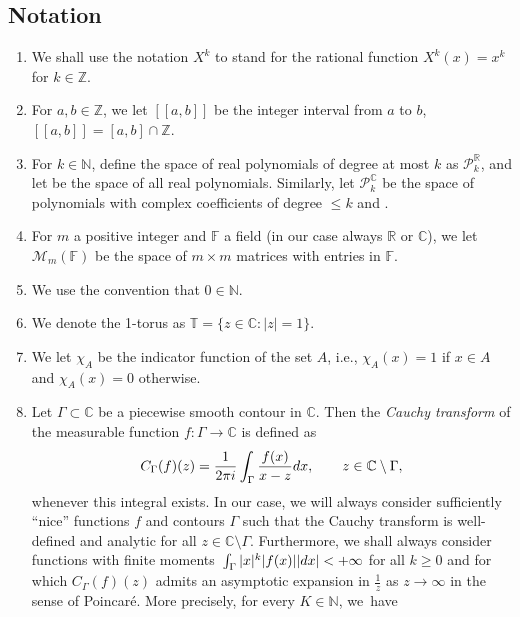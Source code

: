 \documentclass[11pt]{article}
\numberwithin{equation}{section}
\numberwithin{equation}{section}
\begin{document}
\subsection{Notation}
\begin{enumerate}\itemsep=0pt
\item[(1)] We shall use the notation $\mathit{X}^k$ to stand for the rational function $\mathit{X}^k(x) = x^k$ for $k \in \mathbb{Z}$.
\item[(2)] For $a,b \in \mathbb{Z}$, we let $[\![a,b]\!]$ be the integer interval from $a$ to $b$, $[\![a,b]\!] = [a,b] \cap \mathbb{Z}$.
\item[(3)] For $k \in \mathbb{N}$, define the space of real polynomials of degree at most $k$ as
$\mathscr{P}_{k}^\mathbb{R}$, and let
 be the space of all real polynomials. Similarly, let $\mathscr{P}^\mathbb{C}_k$ be the space of polynomials with complex coefficients of degree $\leq k$ and .
\item[(4)] For $m$ a positive integer and $\mathbb{F}$ a field (in our case always $\mathbb{R}$ or $\mathbb{C}$), we let $\mathcal{M}_m (\mathbb{F})$ be the space of $m \times m$ matrices with entries in $\mathbb{F}$.
\item[(5)] We use the convention that $0 \in \mathbb{N}$.
\item[(6)] We denote the 1-torus as $\mathbb{T} = \{ z \in \mathbb{C} \colon |z|=1 \}$.
\item[(7)] We let $\chi_A$ be the indicator function of the set $A$, i.e., $\chi_A(x) = 1$ if $x \in A$ and $\chi_A(x) = 0$ otherwise.
\item[(8)] Let $\Gamma \subset \mathbb{C}$ be a piecewise smooth contour in $\mathbb{C}$. Then the \textit{Cauchy transform} of the measurable function $f\colon \Gamma \longrightarrow \mathbb{C}$ is defined as
\[
C_\Gamma (f) (z) = \frac{1}{2\pi {\rm i}}\int_\Gamma \frac{f(x)}{x-z} {\rm d}x,\qquad z \in \mathbb{C}\setminus \Gamma,
\]
whenever this integral exists. In our case, we will always consider sufficiently \enquote{nice} functions $f$ and contours $\Gamma$ such that the Cauchy transform is well-defined and analytic for all $z \in \mathbb{C}\setminus \Gamma$. Furthermore, we shall always consider functions with finite moments~${\int_\Gamma |x|^k |f(x)| |{\rm d}x| < +\infty}$ for all $k\geq 0$ and for which $C_\Gamma (f)(z)$ admits an asymptotic expansion in $\frac{1}{z}$ as $z \to \infty$ in the sense of Poincar\'e. More precisely, for every $K \in \mathbb{N}$, we~have

\end{enumerate}
\end{document}
